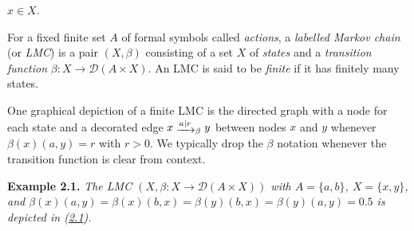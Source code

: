 \documentclass[11pt,a4paper]{amsart}
\begin{document}
\hypertarget{html:S2.SS0.SSS0.P0.SPx1.p1.m15}{}\({x\in X}\).
\par\medskip
\hypertarget{html:S2.SS0.SSS0.P0.SPx1.p2}{} For a fixed finite set %
\hypertarget{html:S2.SS0.SSS0.P0.SPx1.p2.m1}{}\({A}\) of formal symbols called \emph{actions}, a \emph{labelled Markov chain} (or \emph{LMC}) is a pair %
\hypertarget{html:S2.SS0.SSS0.P0.SPx1.p2.m2}{}\({(X,\beta)}\) consisting of a set %
\hypertarget{html:S2.SS0.SSS0.P0.SPx1.p2.m3}{}\({X}\) of \emph{states} and a \emph{transition function} %
\hypertarget{html:S2.SS0.SSS0.P0.SPx1.p2.m4}{}\({\beta\colon X\to{\mathcal{D}}(A\times X)}\). An LMC is said to be \emph{finite} if it has finitely many states.
\par\medskip
\hypertarget{html:S2.SS0.SSS0.P0.SPx1.p3}{} One graphical depiction of a finite LMC is the directed graph with a node for each state and a decorated edge %
\hypertarget{html:S2.SS0.SSS0.P0.SPx1.p3.m1}{}\({x\mathrel{\raisebox{-2.0pt}{$\xrightarrow{a\mid r}$}}_{\beta}y}\) between nodes %
\hypertarget{html:S2.SS0.SSS0.P0.SPx1.p3.m2}{}\({x}\) and %
\hypertarget{html:S2.SS0.SSS0.P0.SPx1.p3.m3}{}\({y}\) whenever %
\hypertarget{html:S2.SS0.SSS0.P0.SPx1.p3.m4}{}\({\beta(x)(a,y)=r}\) with %
\hypertarget{html:S2.SS0.SSS0.P0.SPx1.p3.m5}{}\({r>0}\). We typically drop the %
\hypertarget{html:S2.SS0.SSS0.P0.SPx1.p3.m6}{}\({\beta}\) notation whenever the transition function is clear from context.
\par\medskip
\hypertarget{html:S2.Thmtheorem1}{} \par\noindent\textbf{\textbf{Example 2.1}\textbf{.}}\quad  %
\hypertarget{html:S2.Thmtheorem1.p1}{} \emph{The LMC %
\hypertarget{html:S2.Thmtheorem1.p1.m1}{}\({(X,\beta\colon X\to{\mathcal{D}}(A\times X))}\) with %
\hypertarget{html:S2.Thmtheorem1.p1.m2}{}\({A=\{a,b\}}\), %
\hypertarget{html:S2.Thmtheorem1.p1.m3}{}\({X=\{x,y\}}\), and %
\hypertarget{html:S2.Thmtheorem1.p1.m4}{}\({\beta(x)(a,y)=\beta(x)(b,x)=\beta(y)(b,x)=\beta(y)(a,y)=0.5}\) is depicted in (\hyperlink{html:S2.E1}{2.1}).}
\end{document}
